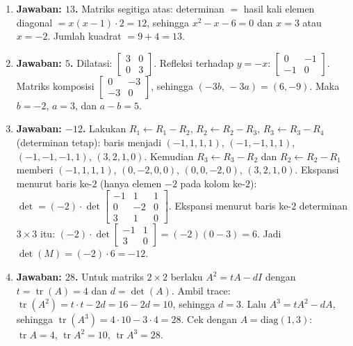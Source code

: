 \documentclass[a4paper,11pt]{article}
\newcommand{\tr}{\operatorname{tr}}
\begin{document}
\small\begin{enumerate}[leftmargin=2em,itemsep=2pt,topsep=2pt]
\item[\textbf{1.}] \textbf{Jawaban: $13$.} Matriks segitiga atas: determinan $=$ hasil kali elemen diagonal $=x(x-1)\cdot2=12$, sehingga $x^2-x-6=0$ dan $x=3$ atau $x=-2$. Jumlah kuadrat $=9+4=13$.
\item[\textbf{2.}] \textbf{Jawaban: $5$.} Dilatasi: $\begin{bmatrix}3&0\\0&3\end{bmatrix}$. Refleksi terhadap $y=-x$: $\begin{bmatrix}0&-1\\-1&0\end{bmatrix}$. Matriks komposisi $\begin{bmatrix}0&-3\\-3&0\end{bmatrix}$, sehingga $(-3b,\,-3a)=(6,-9)$. Maka $b=-2$, $a=3$, dan $a-b=5$.
\item[\textbf{3.}] \textbf{Jawaban: $-12$.} Lakukan $R_1\leftarrow R_1-R_2$, $R_2\leftarrow R_2-R_3$, $R_3\leftarrow R_3-R_4$ (determinan tetap): baris menjadi $(-1,1,1,1)$, $(-1,-1,1,1)$, $(-1,-1,-1,1)$, $(3,2,1,0)$. Kemudian $R_3\leftarrow R_3-R_2$ dan $R_2\leftarrow R_2-R_1$ memberi $(-1,1,1,1)$, $(0,-2,0,0)$, $(0,0,-2,0)$, $(3,2,1,0)$. Ekspansi menurut baris ke-$2$ (hanya elemen $-2$ pada kolom ke-$2$): $\det=(-2)\cdot\det\begin{bmatrix}-1&1&1\\0&-2&0\\3&1&0\end{bmatrix}$. Ekspansi menurut baris ke-$2$ determinan $3\times3$ itu: $(-2)\cdot\det\begin{bmatrix}-1&1\\3&0\end{bmatrix}=(-2)(0-3)=6$. Jadi $\det(M)=(-2)\cdot6=-12$.
\item[\textbf{4.}] \textbf{Jawaban: $28$.} Untuk matriks $2\times2$ berlaku $A^{2}=tA-dI$ dengan $t=\tr(A)=4$ dan $d=\det(A)$. Ambil trace: $\tr(A^{2})=t\cdot t-2d=16-2d=10$, sehingga $d=3$. Lalu $A^{3}=tA^{2}-dA$, sehingga $\tr(A^{3})=4\cdot10-3\cdot4=28$. Cek dengan $A=\mathrm{diag}(1,3)$: $\tr A=4$, $\tr A^2=10$, $\tr A^3=28$.

\end{enumerate}
\end{document}
